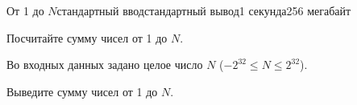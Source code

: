 \begin{problem}{От 1 до $N$}{стандартный ввод}{стандартный вывод}{1 секунда}{256 мегабайт}

Посчитайте сумму чисел от 1 до $N$.

\InputFile
Во входных данных задано целое число $N$ ($-2^{32} \le N \le 2^{32}$).

\OutputFile
Выведите сумму чисел от 1 до $N$.

\Example

\begin{example}
%
\end{example}

\end{problem}

